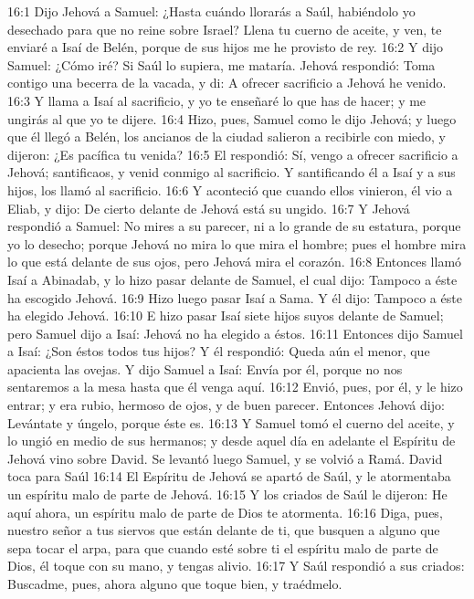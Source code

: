 16:1 Dijo Jehová a Samuel: ¿Hasta cuándo llorarás a Saúl, habiéndolo yo desechado para que no reine sobre Israel? Llena tu cuerno de aceite, y ven, te enviaré a Isaí de Belén, porque de sus hijos me he provisto de rey.  
16:2 Y dijo Samuel: ¿Cómo iré? Si Saúl lo supiera, me mataría. Jehová respondió: Toma contigo una becerra de la vacada, y di: A ofrecer sacrificio a Jehová he venido.  
16:3 Y llama a Isaí al sacrificio, y yo te enseñaré lo que has de hacer; y me ungirás al que yo te dijere.  
16:4 Hizo, pues, Samuel como le dijo Jehová; y luego que él llegó a Belén, los ancianos de la ciudad salieron a recibirle con miedo, y dijeron: ¿Es pacífica tu venida?  
16:5 El respondió: Sí, vengo a ofrecer sacrificio a Jehová; santificaos, y venid conmigo al sacrificio. Y santificando él a Isaí y a sus hijos, los llamó al sacrificio.  
16:6 Y aconteció que cuando ellos vinieron, él vio a Eliab, y dijo: De cierto delante de Jehová está su ungido.  
16:7 Y Jehová respondió a Samuel: No mires a su parecer, ni a lo grande de su estatura, porque yo lo desecho; porque Jehová no mira lo que mira el hombre; pues el hombre mira lo que está delante de sus ojos, pero Jehová mira el corazón.  
16:8 Entonces llamó Isaí a Abinadab, y lo hizo pasar delante de Samuel, el cual dijo: Tampoco a éste ha escogido Jehová. 
16:9 Hizo luego pasar Isaí a Sama. Y él dijo: Tampoco a éste ha elegido Jehová.  
16:10 E hizo pasar Isaí siete hijos suyos delante de Samuel; pero Samuel dijo a Isaí: Jehová no ha elegido a éstos.  
16:11 Entonces dijo Samuel a Isaí: ¿Son éstos todos tus hijos? Y él respondió: Queda aún el menor, que apacienta las ovejas. Y dijo Samuel a Isaí: Envía por él, porque no nos sentaremos a la mesa hasta que él venga aquí.  
16:12 Envió, pues, por él, y le hizo entrar; y era rubio, hermoso de ojos, y de buen parecer. Entonces Jehová dijo: Levántate y úngelo, porque éste es.  
16:13 Y Samuel tomó el cuerno del aceite, y lo ungió en medio de sus hermanos; y desde aquel día en adelante el Espíritu de Jehová vino sobre David. Se levantó luego Samuel, y se volvió a Ramá.  
David toca para Saúl  
16:14 El Espíritu de Jehová se apartó de Saúl, y le atormentaba un espíritu malo de parte de Jehová.  
16:15 Y los criados de Saúl le dijeron: He aquí ahora, un espíritu malo de parte de Dios te atormenta.  
16:16 Diga, pues, nuestro señor a tus siervos que están delante de ti, que busquen a alguno que sepa tocar el arpa, para que cuando esté sobre ti el espíritu malo de parte de Dios, él toque con su mano, y tengas alivio.  
16:17 Y Saúl respondió a sus criados: Buscadme, pues, ahora alguno que toque bien, y traédmelo.  

